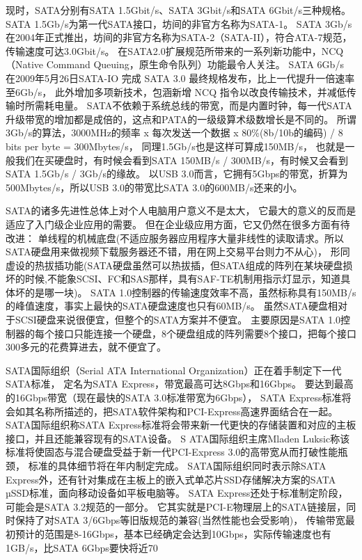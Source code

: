 现时，SATA分别有SATA 1.5Gbit/s、SATA 3Gbit/s和SATA 6Gbit/s三种规格。
SATA 1.5Gb/s为第一代SATA接口，坊间的非官方名称为SATA-1。
SATA 3Gb/s在2004年正式推出，坊间的非官方名称为SATA-2（SATA-II），符合ATA-7规范，传输速度可达3.0Gbit/s。
在SATA2.0扩展规范所带来的一系列新功能中，NCQ（Native Command Queuing，原生命令队列）功能最令人关注。
SATA 6Gb/s 在2009年5月26日SATA-IO 完成 SATA 3.0 最终规格发布，比上一代提升一倍速率至6Gb/s，
此外增加多项新技术，包涵新增 NCQ 指令以改良传输技术，并减低传输时所需耗电量。
SATA不依赖于系统总线的带宽，而是内置时钟，每一代SATA升级带宽的增加都是成倍的，这点和PATA的一级级算术级数增长是不同的。
所谓3Gb/s的算法，3000MHz的频率 x 每次发送一个数据 x 80\%(8b/10b的编码) / 8 bits per byte = 300Mbytes/s，
同理1.5Gb/s也是这样可算成150MB/s，
也就是一般我们在买硬盘时，有时候会看到SATA 150MB/s / 300MB/s，有时候又会看到SATA 1.5Gb/s / 3Gb/s的缘故。
以USB 3.0而言，它拥有5Gbps的带宽，折算为500Mbytes/s，所以USB 3.0的带宽比SATA 3.0的600MB/s还来的小。

SATA的诸多先进性总体上对个人电脑用户意义不是太大，
它最大的意义的反而是适应了入门级企业应用的需要。 
但在企业级应用方面，它又仍然在很多方面有待改进：
单线程的机械底盘(不适应服务器应用程序大量非线性的读取请求。所以SATA硬盘用来做视频下载服务器还不错，用在网上交易平台则力不从心)，
形同虚设的热拔插功能(SATA硬盘虽然可以热拔插，但SATA组成的阵列在某块硬盘损坏的时候,不能象SCSI、FC和SAS那样，具有SAF-TE机制用指示灯显示，知道具体坏的是哪一块)。
SATA 1.0控制器的传输速度效率不高，虽然标称具有150MB/s的峰值速度，事实上最快的SATA硬盘速度也只有60MB/s。
虽然SATA硬盘相对于SCSI硬盘来说很便宜，但整个的SATA方案并不便宜。
主要原因是SATA 1.0控制器的每个接口只能连接一个硬盘，8个硬盘组成的阵列需要8个接口，把每个接口300多元的花费算进去，就不便宜了。 

SATA国际组织（Serial ATA International Organization）正在着手制定下一代SATA标准，
定名为SATA Express，带宽最高可达8Gbps和16Gbps。 要达到最高的16Gbps带宽（现在最快的SATA 3.0标准带宽为6Gbps），
SATA Express标准将会如其名称所描述的，把SATA软件架构和PCI-Express高速界面结合在一起。
SATA国际组织称SATA Express标准将会带来新一代更快的存储装置和对应的主板接口，并且还能兼容现有的SATA设备。 S
ATA国际组织主席Mladen Luksic称该标准将使固态与混合硬盘受益于新一代PCI-Express 3.0的高带宽从而打破性能瓶颈，
标准的具体细节将在年内制定完成。 
SATA国际组织同时表示除SATA Express外，还有针对集成在主板上的嵌入式单芯片SSD存储解决方案的SATA µSSD标准，面向移动设备如平板电脑等。
SATA Express还处于标准制定阶段，可能会是SATA 3.2规范的一部分。
它其实就是PCI-E物理层上的SATA链接层，同时保持了对SATA 3/6Gbps等旧版规范的兼容(当然性能也会受影响)，
传输带宽最初预计的范围是8-16Gbps，基本已经确定会达到10Gbps，实际传输速度也有1GB/s，比SATA 6Gbps要快将近70%





